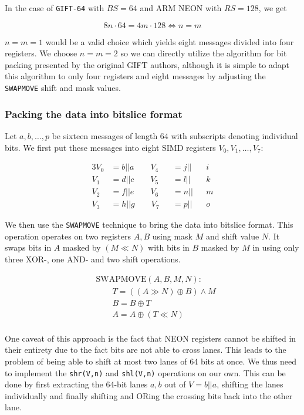 \documentclass[12pt]{report}
\begin{document}
In the case of \texttt{GIFT-64} with $BS=64$ and ARM NEON with $RS=128$, we get

\[
    8n\cdot 64=4m\cdot 128\Leftrightarrow n=m
\]

$n=m=1$ would be a valid choice which yields eight messages divided into four
registers. We choose $n=m=2$ so we can directly utilize the algorithm for bit
packing presented by the original GIFT authors, although it is simple to adapt
this algorithm to only four registers and eight messages by adjusting the
\texttt{SWAPMOVE} shift and mask values.

\subsubsection{Packing the data into bitslice format}

Let $a,b,\dots,p$ be sixteen messages of length $64$ with subscripts denoting
individual bits. We first put these messages into eight SIMD registers
$V_0,V_1,\dots,V_7$:

\begin{alignat*}{3}
    V_0&=b||a\qquad V_4&&=j||&&i \\
    V_1&=d||c\qquad V_5&&=l||&&k \\
    V_2&=f||e\qquad V_6&&=n||&&m \\
    V_3&=h||g\qquad V_7&&=p||&&o
\end{alignat*}

We then use the \texttt{SWAPMOVE} technique to bring the data into bitslice
format. This operation operates on two registers $A,B$ using mask $M$ and shift
value $N$. It swaps bits in $A$ masked by $(M\ll N)$ with bits in $B$ masked by
$M$ in using only three XOR-, one AND- and two shift operations.

\begin{align*}
    &\text{SWAPMOVE}(A,B,M,N): \\
    &\qquad T=((A\gg N)\oplus B)\land M \\
    &\qquad B=B\oplus T \\
    &\qquad A=A\oplus (T\ll N) \\
\end{align*}

One caveat of this approach is the fact that NEON registers cannot be shifted
in their entirety due to the fact bits are not able to cross lanes. This leads
to the problem of being able to shift at most two lanes of 64 bits at once. We
thus need to implement the \texttt{shr(V,n)} and \texttt{shl(V,n)} operations
on our own. This can be done by first extracting the 64-bit lanes $a,b$ out of
$V=b||a$, shifting the lanes individually and finally shifting and ORing the
crossing bits back into the other lane.
\end{document}
